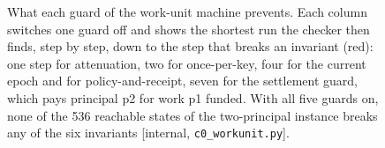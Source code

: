 \begin{figure}[H]
\caption{What each guard of the work-unit machine prevents. Each column switches
one guard off and shows the shortest run the checker then finds, step by step,
down to the step that breaks an invariant (red): one step for attenuation, two
for once-per-key, four for the current epoch and for policy-and-receipt, seven
for the settlement guard, which pays principal p2 for work p1 funded. With all five guards on, none of the 536 reachable
states of the two-principal instance breaks any of the six invariants
[internal, \texttt{c0\_workunit.py}].}
\label{fig:swk-workunit-crimes}
\end{figure}
